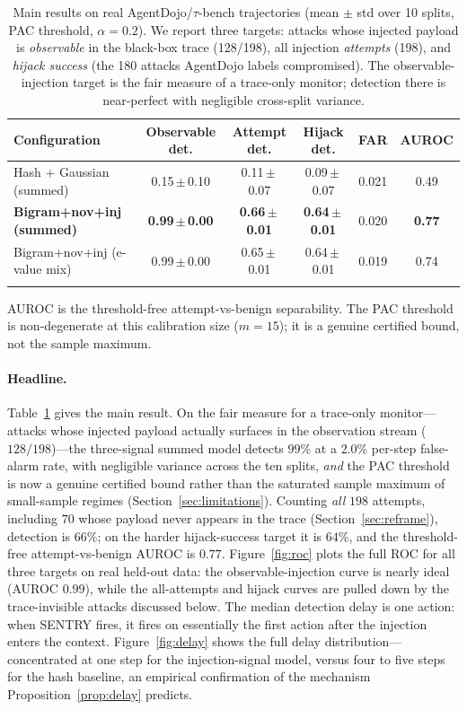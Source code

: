 \documentclass[pdflatex,sn-mathphys-num]{sn-jnl}%
\theoremstyle{thmstyleone}%
\theoremstyle{thmstyletwo}%
\theoremstyle{thmstylethree}%
\begin{document}
\begin{table}[t]
\centering
\caption{Main results on real AgentDojo/$\tau$-bench trajectories
(mean \(\pm\) std over 10 splits, PAC threshold, \(\alpha=0.2\)). We report
three targets: attacks whose injected payload is \emph{observable} in the
black-box trace (128/198), all injection \emph{attempts} (198), and
\emph{hijack success} (the 180 attacks AgentDojo labels compromised). The
observable-injection target is the fair measure of a trace-only monitor;
detection there is near-perfect with negligible cross-split variance.}
\label{tab:main}
\begin{tabular}{@{}lccccc@{}}
\toprule
Configuration & Observable det. & Attempt det. & Hijack det. & FAR & AUROC \\
\midrule
Hash + Gaussian (summed)          & 0.15\,$\pm$\,0.10 & 0.11\,$\pm$\,0.07 & 0.09\,$\pm$\,0.07 & 0.021 & 0.49 \\
\textbf{Bigram+nov+inj (summed)}  & \textbf{0.99\,$\pm$\,0.00} & \textbf{0.66\,$\pm$\,0.01} & \textbf{0.64\,$\pm$\,0.01} & 0.020 & \textbf{0.77} \\
Bigram+nov+inj (e-value mix)      & 0.99\,$\pm$\,0.00 & 0.65\,$\pm$\,0.01 & 0.64\,$\pm$\,0.01 & 0.019 & 0.74 \\
\botrule
\end{tabular}
\vspace{3pt}

{\footnotesize AUROC is the threshold-free attempt-vs-benign separability. The
PAC threshold is non-degenerate at this calibration size (\(m=15\)); it is a
genuine certified bound, not the sample maximum.}
\end{table}

\paragraph{Headline.} Table~\ref{tab:main} gives the main result. On the fair
measure for a trace-only monitor---attacks whose injected payload actually
surfaces in the observation stream (\(128/198\))---the three-signal summed model
detects \(99\%\) at a \(2.0\%\) per-step false-alarm rate, with negligible
variance across the ten splits, \emph{and} the PAC threshold is now a genuine
certified bound rather than the saturated sample maximum of small-sample
regimes (Section~\ref{sec:limitations}). Counting \emph{all} \(198\) attempts,
including \(70\) whose payload never appears in the trace
(Section~\ref{sec:reframe}), detection is \(66\%\); on the harder
hijack-success target it is \(64\%\), and the threshold-free attempt-vs-benign
AUROC is \(0.77\). Figure~\ref{fig:roc} plots the full ROC for all three
targets on real held-out data: the observable-injection curve is nearly
ideal (AUROC \(0.99\)), while the all-attempts and hijack curves are pulled
down by the trace-invisible attacks discussed below. The median detection
delay is one action: when SENTRY fires,
it fires on essentially the first action after the injection enters the
context. Figure~\ref{fig:delay} shows the full delay distribution---
concentrated at one step for the injection-signal model, versus four to five
steps for the hash baseline, an empirical confirmation of the mechanism
Proposition~\ref{prop:delay} predicts.
\end{document}
